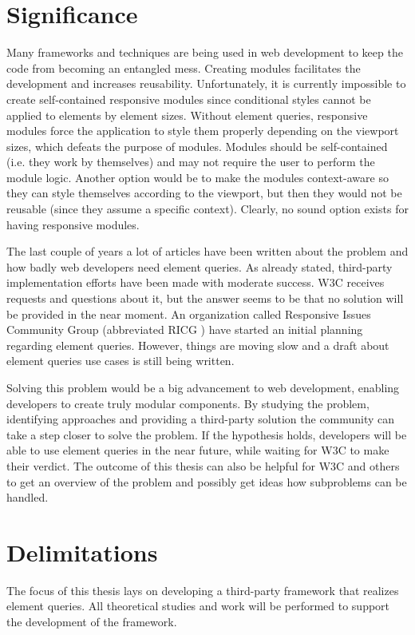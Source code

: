 \documentclass[a4paper,11pt]{kth-mag}
\newcommand\abbr[2][]{\uppercase{#2}\ifthenelse{\equal{#1}{}}%
                     {}{#1}}
\begin{document}
    \section{Significance}
      Many frameworks and techniques are being used in web development to keep the code from becoming an entangled mess.
      Creating modules facilitates the development and increases reusability.
      Unfortunately, it is currently impossible to create self-contained responsive modules since conditional styles cannot be applied to elements by element sizes.
      Without element queries, responsive modules force the application to style them properly depending on the viewport sizes, which defeats the purpose of modules.
      Modules should be self-contained (i.e. they work by themselves) and may not require the user to perform the module logic.
      Another option would be to make the modules context-aware so they can style themselves according to the viewport, but then they would not be reusable (since they assume a specific context).
      Clearly, no sound option exists for having responsive modules.

      The last couple of years a lot of articles have been written about the problem and how badly web developers need element queries.
      As already stated, third-party implementation efforts have been made with moderate success.
      \abbr{w3c} receives requests and questions about it, but the answer seems to be that no solution will be provided in the near moment. 
      An organization called Responsive Issues Community Group (abbreviated \abbr{ricg}) have started an initial planning regarding element queries.
      However, things are moving slow and a draft about element queries use cases is still being written.

      Solving this problem would be a big advancement to web development, enabling developers to create truly modular components.
      By studying the problem, identifying approaches and providing a third-party solution the community can take a step closer to solve the problem.
      If the hypothesis holds, developers will be able to use element queries in the near future, while waiting for \abbr{w3c} to make their verdict.
      The outcome of this thesis can also be helpful for \abbr{w3c} and others to get an overview of the problem and possibly get ideas how subproblems can be handled.
    \section{Delimitations}
      The focus of this thesis lays on developing a third-party framework that realizes element queries.
      All theoretical studies and work will be performed to support the development of the framework.
\end{document}
